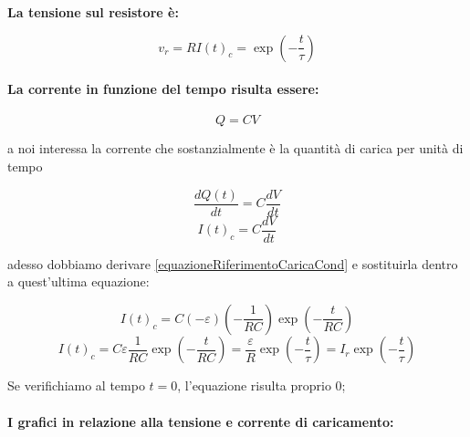 \textbf{La tensione sul resistore è:}

\begin{equation}
    v_r = RI(t)_c =  \exp(-\frac{t}{\tau})
\end{equation}

\paragraph{La corrente in funzione del tempo risulta essere:}

\begin{equation*}
    Q = CV
\end{equation*}

a noi interessa la corrente che sostanzialmente è la quantità di carica per unità di tempo

\begin{equation*}
    \frac{dQ(t)}{dt} = C\frac{dV}{dt}
\end{equation*}
\begin{equation*}
    I(t)_c = C\frac{dV}{dt}
\end{equation*}

adesso dobbiamo derivare \ref{equazioneRiferimentoCaricaCond} e sostituirla dentro a quest'ultima equazione:

\begin{equation*}
    I(t)_c = C(-\varepsilon)(-\frac{1}{RC})\exp(-\frac{t}{RC})
\end{equation*}
\begin{equation}
    I(t)_c = C\varepsilon\frac{1}{RC} \exp(-\frac{t}{RC}) =\frac{\varepsilon}{R}\exp(-\frac{t}{\tau}) = I_r\exp(-\frac{t}{\tau})
    \label{equazioneRiferimentoCaricaCorrenteCond}
\end{equation}

Se verifichiamo al tempo $t = 0$, l'equazione risulta proprio $0$;

\newpage
\paragraph{}
\textbf{I grafici in relazione alla tensione e corrente di caricamento:}

